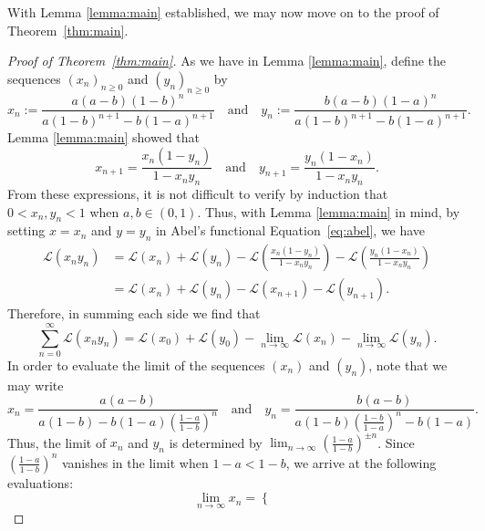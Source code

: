 \documentclass[10pt]{article}
\theoremstyle{definition}
\begin{document}
With Lemma \ref{lemma:main} established, we may now move on to the proof of Theorem~\ref{thm:main}.
\begin{proof}[Proof of Theorem~\ref{thm:main}]
    As we have in Lemma \ref{lemma:main}, define the sequences $(x_n)_{n\geq 0}$ and $(y_n)_{n\geq 0}$ by
    \begin{equation*}
        x_{n} := \frac{a(a-b)(1-b)^n }{a(1-b)^{n+1} - b(1-a)^{n+1}} \quad \text{and} \quad y_{n} := \frac{b(a-b)(1-a)^n }{a(1-b)^{n+1} - b(1-a)^{n+1}}.
    \end{equation*}
    Lemma \ref{lemma:main} showed that
    \begin{equation*}
        x_{n+1} = \frac{x_n(1-y_n)}{1-x_n y_n} \quad \text{and} \quad  y_{n+1} = \frac{y_n(1-x_n)}{1-x_n y_n}.
    \end{equation*}
    From these expressions, it is not difficult to verify by induction that $0 < x_n ,y_n < 1$ when $a,b \in (0,1)$.  Thus, with Lemma \ref{lemma:main} in mind, by setting $x = x_n$ and $y= y_n$ in Abel's functional Equation~\eqref{eq:abel}, we have
    \begin{align*}
    \mathcal{L}(x_n y_n) &= \mathcal{L}(x_n) + \mathcal{L}(y_n) - \mathcal{L}\left(\frac{x_n(1-y_n)}{1-x_n y_n}\right) - \mathcal{L}\left(\frac{y_n(1-x_n)}{1-x_n y_n}\right) \\
    &= \mathcal{L}(x_n) + \mathcal{L}(y_n) - \mathcal{L}(x_{n+1}) - \mathcal{L}(y_{n+1}).
\end{align*}
Therefore, in summing each side we find that
\begin{equation}
   \sum_{n=0}^{\infty}\mathcal{L}(x_n y_n) = \mathcal{L}(x_0) + \mathcal{L}(y_0) - \lim_{n\to \infty}\mathcal{L}(x_n) - \lim_{n\to \infty}\mathcal{L}(y_n). \label{eq:main_telescopic_series}
\end{equation}
In order to evaluate the limit of the sequences $(x_n)$ and $(y_n)$, note that we may write
\begin{equation*}
    x_{n} = \frac{a(a-b)}{a(1-b) - b(1-a)\left(\frac{1-a}{1-b}\right)^n} \quad \text{and} \quad y_{n} = \frac{b(a-b)}{a(1-b)\left(\frac{1-b}{1-a}\right)^n - b(1-a)}.
\end{equation*}
Thus, the limit of $x_n$ and $y_n$ is determined by $\lim_{n \to \infty} \left(\frac{1-a}{1-b}\right)^{\pm n}$.  Since $ \left(\frac{1-a}{1-b}\right)^{n}$ vanishes in the limit when $1-a < 1 - b$, we arrive at the following evaluations:
\begin{equation*}
    \lim_{n\to\infty}x_n = \begin{cases}

\end{cases}
\end{equation*}
\end{proof}
\end{document}
